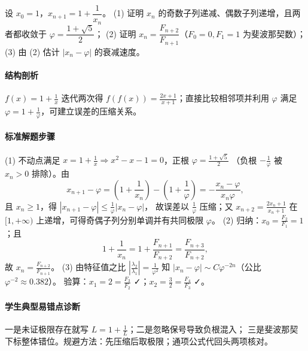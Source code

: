 \begin{problem}
设 $x_0=1$，$x_{n+1}=1+\dfrac1{x_n}$。
(1) 证明 $x_n$ 的奇数子列递减、偶数子列递增，且两者都收敛于
$\varphi=\dfrac{1+\sqrt5}{2}$；
(2) 证明 $x_n=\dfrac{F_{n+2}}{F_{n+1}}$（$F_0=0,F_1=1$ 为斐波那契数）；
(3) 由 (2) 估计 $|x_n-\varphi|$ 的衰减速度。
\end{problem}
\begin{solution}
\paragraph{结构剖析}
$f(x)=1+\frac1x$ 迭代两次得 $f(f(x))=\frac{2x+1}{x+1}$；直接比较相邻项并利用
$\varphi$ 满足 $\varphi=1+\frac1\varphi$，可建立误差的压缩关系。
\paragraph{标准解题步骤}
(1) 不动点满足 $x=1+\frac1x\Rightarrow x^2-x-1=0$，正根 $\varphi=\frac{1+\sqrt5}{2}$
（负根 $-\frac1\varphi$ 被 $x_n>0$ 排除）。由
\[
  x_{n+1}-\varphi=\left(1+\frac1{x_n}\right)-\left(1+\frac1\varphi\right)
  =-\frac{x_n-\varphi}{x_n\varphi},
\]
且 $x_n\ge1$，得 $|x_{n+1}-\varphi|\le\frac1\varphi|x_n-\varphi|$，
故误差以 $\frac1\varphi$ 压缩；又 $x_{n+2}=\frac{2x_n+1}{x_n+1}$ 在 $[1,+\infty)$
上递增，可得奇偶子列分别单调并有共同极限 $\varphi$。
(2) 归纳：$x_0=\frac{F_2}{F_1}=1$；且
\[
  1+\frac1{x_n}=1+\frac{F_{n+1}}{F_{n+2}}
  =\frac{F_{n+3}}{F_{n+2}},
  \]
故 $x_n=\frac{F_{n+2}}{F_{n+1}}$。
(3) 由特征值之比 $\left|\frac{\lambda_2}{\lambda_1}\right|=\frac1{\varphi^2}$
知 $|x_n-\varphi|\sim C\varphi^{-2n}$（公比 $\varphi^{-2}\approx0.382$）。
验算：$x_1=2=\frac{F_3}{F_2}$ ✓；$x_2=\frac32=\frac{F_4}{F_3}$ ✓。
\paragraph{学生典型易错点诊断}
一是未证极限存在就写 $L=1+\frac1L$；二是忽略保号导致负根混入；
三是斐波那契下标整体错位。规避方法：先压缩后取极限；通项公式代回头两项核对。
\end{solution}

